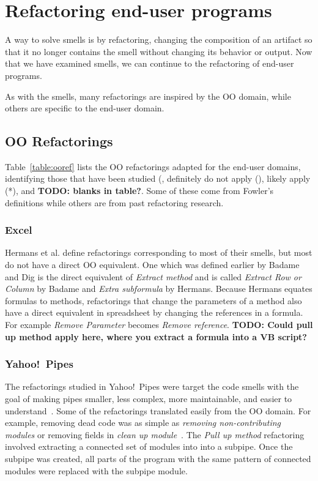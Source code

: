 \documentclass[10pt,conference,compsocconf]{IEEEtran}
\newcommand{\todo}[1]{\textbf{TODO: #1}}
\begin{document}
\section{Refactoring end-user programs}
\label{sec:refactoring}

A way to solve smells is by refactoring, changing the composition of an artifact so that it no longer contains the smell without changing its behavior or output.
Now that we have examined smells, we can continue to the refactoring of end-user programs.

As with the smells, many refactorings are inspired by the OO domain, while others are specific to the end-user domain. 

\subsection{OO Refactorings}
Table~\ref{table:ooref} lists the OO refactorings adapted for the end-user domains, identifying those that have been studied (, definitely do not apply (), likely apply (*), and \todo{blanks in table?}. Some of these come from Fowler's definitions while others are from past refactoring research. 

\subsubsection{Excel}

Hermans et al. \cite{Hermans2012intraExt} define refactorings corresponding to most of their smells, but most do not have a direct OO equivalent.
One which was defined earlier by Badame and Dig \cite{badame2012refactoring} is the direct equivalent of \emph{Extract method} and is called \emph{Extract Row or Column} by Badame and \emph{Extra subformula} by Hermans. Because Hermans equates formulas to methods, refactorings that change the parameters of a method also have a direct equivalent in spreadsheet by changing the references in a formula. For example \emph{Remove Parameter} becomes \emph{Remove reference}. \todo{Could pull up method apply here, where you extract a formula into a VB script?}
 
\subsubsection{Yahoo!\ Pipes}
The refactorings studied in Yahoo!\ Pipes were target the code smells with the goal of making pipes smaller, less complex, more maintainable, and easier to understand~\cite{StoleeTSE2013}. Some of the refactorings translated easily from the OO domain. For example, removing dead code was as simple as \emph{removing non-contributing modules} or removing fields in \emph{clean up module}~\cite{StoleeTSE2013}. The \emph{Pull up method} refactoring involved extracting a connected set of modules into into a subpipe. Once the subpipe was created, all  parts of the program with the same pattern of connected modules were replaced with the subpipe module. 
\end{document}
